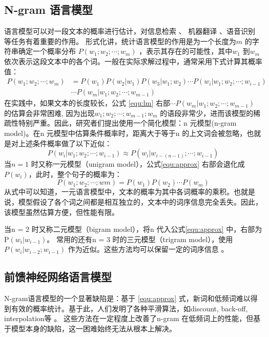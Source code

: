 \documentclass[12pt,a4paper]{article}
\begin{document}
\subsection{N-gram 语言模型}
语言模型可以对一段文本的概率进行估计，对信息检索 \cite{Jin:2002:TLM:564376.564386}、 机器翻译 \cite{DBLP:conf/naacl/BaltescuB15}、语音识别 \cite{DBLP:conf/interspeech/SakSB14}等任务有着重要的作用。
形式化讲，统计语言模型的作用是为一个长度为$m$ 的字符串确定一个概率分布 $P(w_1;w_2;\cdots;w_m)$ ，表示其存在的可能性，其中$w_1$ 到$w_m$ 依次表示这段文本中的各个词。一般在实际求解过程中，通常采用下式计算其概率值：
\begin{equation}
\label{equ:lm}
\begin{split}
P(w_1;w_2; \cdots;w_m) &= P(w_1) P(w_2|w_1) P(w_3|w_1;w_2)\cdots P(w_i | w_1;w_2;\cdots;w_{i-1}) \\
&\cdots P(w_m | w_1;w_2;\cdots;w_{m-1})
\end{split}
\end{equation}
在实践中，如果文本的长度较长，公式 \ref{equ:lm} 右部$\cdots P(w_m | w_1;w_2;\cdots;w_{m-1}) $  的估算会非常困难, 因为出现$w_1;w_2;\cdots;w_{m-1};w_{m}$ 的语段非常少，进而该模型的稀疏性特别严重。因此，研究者们提出使用一个简化模型：n 元模型(n-gram model)。在n 元模型中估算条件概率时，距离大于等于n 的上文词会被忽略，也就是对上述条件概率做了以下近似：
\begin{equation}
\label{equ:approx}
P(w_i | w_1;w_2;\cdots;w_{i-1})  \approx P(w_i | w_{i-(n-1)};\cdots;w_{i-1})
\end{equation}
当$n = 1$ 时又称一元模型（unigram model），公式\ref{equ:approx} 右部会退化成$P(w_i)$，此时，整个句子的概率为：
\begin{equation}
P(w_1;w_2; \cdots;wm) = P(w_1)P(w_2) \cdots P(w_m)
\end{equation}
从式中可以知道，一元语言模型中，文本的概率为其中各词概率的乘积。也就是说，模型假设了各个词之间都是相互独立的，文本中的词序信息完全丢失。因此，该模型虽然估算方便，但性能有限。

当n = 2 时又称二元模型（bigram model），将n 代入公式\ref{equ:approx} 中，右部为P$(w_i|w_{i-1})$。 常用的还有n = 3 时的三元模型（trigram model），使用$P(w_i |w_{i-2};w_{i-1})$ 作为近似。这些方法均可以保留一定的词序信息 \cite{DBLP:journals/csl/ChenG99}。

\subsection{前馈神经网络语言模型}
N-gram语言模型的一个显著缺陷是：基于 \ref{equ:approx} 式，新词和低频词难以得到有效的概率统计。基于此，人们发明了各种平滑算法，如discount, back-off, interpolation等 \cite{DBLP:conf/interspeech/2009,DBLP:journals/csl/ZhouL99}。 这些方法在一定程度上改善了n-gram 在低频词上的性能，但基于模型本身的缺陷，这一困难始终无法从根本上解决。
\end{document}
